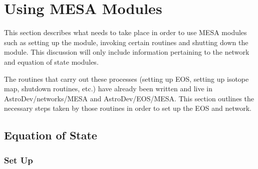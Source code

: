 \section{Using {\sf MESA} Modules}

This section describes what needs to take place in order to use 
{\sf MESA} modules such as setting up the module, invoking certain routines 
and shutting down the module. This discussion will only include information 
pertaining to the network and equation of state modules.

The routines that carry out these processes (setting up EOS, setting up 
isotope map, shutdown routines, etc.) have already been written and live in 
{\sf AstroDev/networks/MESA} and {\sf AstroDev/EOS/MESA}. This section 
outlines the necessary steps taken by those routines in order to set up the 
EOS and network. 

 
\subsection{Equation of State}

\subsubsection{Set Up}

